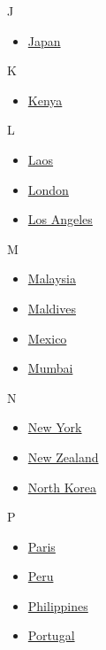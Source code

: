 J

\begin{itemize}
\tightlist
\item
  \href{/travel/destinations/japan}{Japan}
\end{itemize}

K

\begin{itemize}
\tightlist
\item
  \href{/travel/destinations/kenya}{Kenya}
\end{itemize}

L

\begin{itemize}
\tightlist
\item
  \href{/travel/destinations/laos}{Laos}
\item
  \href{/travel/destinations/london/}{London}
\item
  \href{/travel/destinations/los-angeles}{Los Angeles}
\end{itemize}

M

\begin{itemize}
\tightlist
\item
  \href{/travel/destinations/malaysia}{Malaysia}
\item
  \href{/travel/destinations/maldives}{Maldives}
\item
  \href{/travel/destinations/mexico}{Mexico}
\item
  \href{/travel/destinations/mumbai}{Mumbai}
\end{itemize}

N

\begin{itemize}
\tightlist
\item
  \href{/travel/destinations/new-york}{New York}
\item
  \href{/travel/destinations/new-zealand}{New Zealand}
\item
  \href{/travel/destinations/north-korea}{North Korea}
\end{itemize}

P

\begin{itemize}
\tightlist
\item
  \href{/travel/destinations/paris}{Paris}
\item
  \href{/travel/destinations/peru}{Peru}
\item
  \href{/travel/destinations/philippines}{Philippines}
\item
  \href{/travel/destinations/portugal}{Portugal}
\end{itemize}

